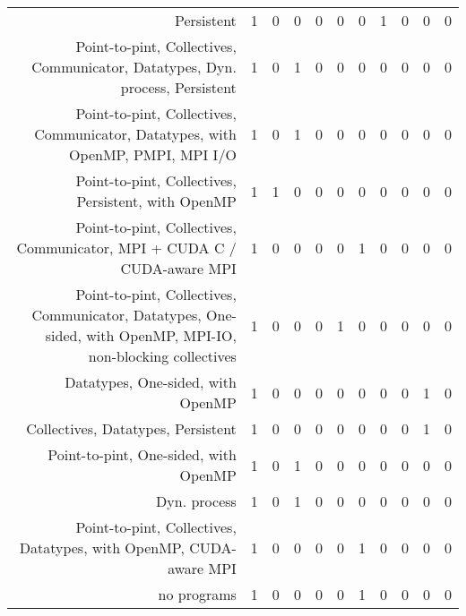 {\begin{landscape}
\begin{longtable}[htb]{r|c|c|c|c|c|c|c|c|c|c}
{Persistent} & 1 & 0 & 0 & 0 & 0 & 0 & 1 & 0 & 0 & 0 \\%
{Point-to-pint, Collectives, Communicator, Datatypes, Dyn. process, Persistent} & 1 & 0 & 1 & 0 & 0 & 0 & 0 & 0 & 0 & 0 \\%
{Point-to-pint, Collectives, Communicator, Datatypes, with OpenMP, PMPI, MPI I/O} & 1 & 0 & 1 & 0 & 0 & 0 & 0 & 0 & 0 & 0 \\%
{Point-to-pint, Collectives, Persistent, with OpenMP} & 1 & 1 & 0 & 0 & 0 & 0 & 0 & 0 & 0 & 0 \\%
{Point-to-pint, Collectives, Communicator, MPI + CUDA C / CUDA-aware MPI} & 1 & 0 & 0 & 0 & 0 & 1 & 0 & 0 & 0 & 0 \\%
{Point-to-pint, Collectives, Communicator, Datatypes, One-sided, with OpenMP, MPI-IO, non-blocking collectives} & 1 & 0 & 0 & 0 & 1 & 0 & 0 & 0 & 0 & 0 \\%
{Datatypes, One-sided, with OpenMP} & 1 & 0 & 0 & 0 & 0 & 0 & 0 & 0 & 1 & 0 \\%
{Collectives, Datatypes, Persistent} & 1 & 0 & 0 & 0 & 0 & 0 & 0 & 0 & 1 & 0 \\%
{Point-to-pint, One-sided, with OpenMP} & 1 & 0 & 1 & 0 & 0 & 0 & 0 & 0 & 0 & 0 \\%
{Dyn. process} & 1 & 0 & 1 & 0 & 0 & 0 & 0 & 0 & 0 & 0 \\%
{Point-to-pint, Collectives, Datatypes, with OpenMP, CUDA-aware MPI} & 1 & 0 & 0 & 0 & 0 & 1 & 0 & 0 & 0 & 0 \\%
{no programs} & 1 & 0 & 0 & 0 & 0 & 1 & 0 & 0 & 0 & 0 \\%
\hline%
\end{longtable}%
\end{landscape}}%
\clearpage%
